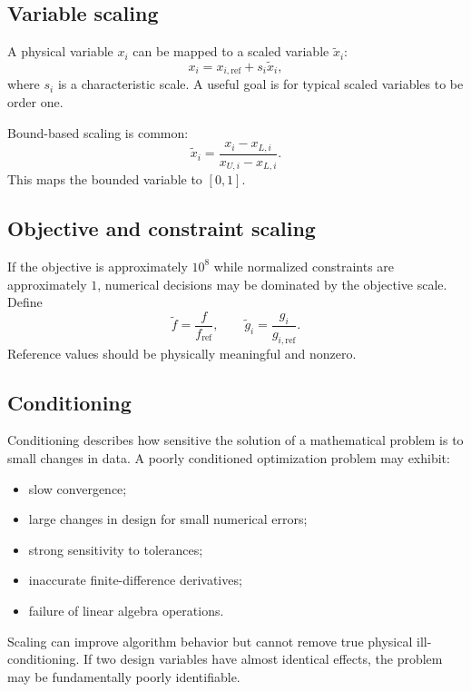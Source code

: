 \documentclass[11pt]{article}
\begin{document}
\subsection{Variable scaling}

A physical variable $x_i$ can be mapped to a scaled variable $\tilde{x}_i$:
\begin{equation}
x_i = x_{i,\mathrm{ref}} + s_i\tilde{x}_i,
\end{equation}
where $s_i$ is a characteristic scale. A useful goal is for typical scaled variables to be order one.

Bound-based scaling is common:
\begin{equation}
\tilde{x}_i = \frac{x_i-x_{L,i}}{x_{U,i}-x_{L,i}}.
\end{equation}
This maps the bounded variable to $[0,1]$.

\subsection{Objective and constraint scaling}

If the objective is approximately $10^8$ while normalized constraints are approximately $1$, numerical decisions may be dominated by the objective scale. Define
\begin{equation}
\tilde{f}=\frac{f}{f_{\mathrm{ref}}}, \qquad
\tilde{g}_i=\frac{g_i}{g_{i,\mathrm{ref}}}.
\end{equation}
Reference values should be physically meaningful and nonzero.

\subsection{Conditioning}

Conditioning describes how sensitive the solution of a mathematical problem is to small changes in data. A poorly conditioned optimization problem may exhibit:
\begin{itemize}[leftmargin=1.4em]
  \item slow convergence;
  \item large changes in design for small numerical errors;
  \item strong sensitivity to tolerances;
  \item inaccurate finite-difference derivatives;
  \item failure of linear algebra operations.
\end{itemize}

Scaling can improve algorithm behavior but cannot remove true physical ill-conditioning. If two design variables have almost identical effects, the problem may be fundamentally poorly identifiable.
\end{document}
